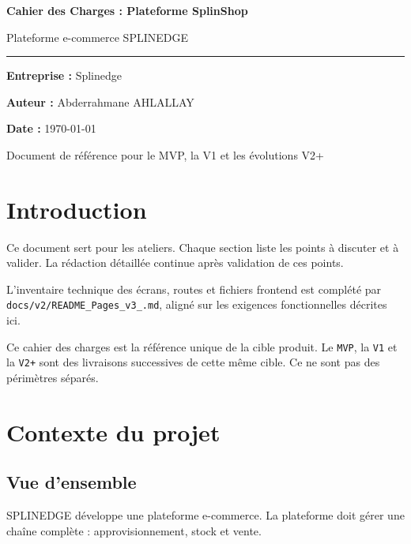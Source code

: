 \documentclass[11pt,a4paper]{scrreprt}
\newcommand{\code}[1]{\texttt{#1}}
\begin{document}
\begin{titlepage}
  \centering
  \vspace*{2cm}
  {\sffamily\bfseries\Huge\color{SplinGreen} Cahier des Charges : Plateforme SplinShop\par}
  \vspace{0.8cm}
  {\Large\color{SplinAmber} Plateforme e-commerce SPLINEDGE\par}
  \vspace{2cm}
  \rule{0.75\textwidth}{1.2pt}\par
  \vspace{1cm}
  {\Large \textbf{Entreprise :} Splinedge\par}
  \vspace{0.4cm}
  {\Large \textbf{Auteur :} Abderrahmane AHLALLAY\par}
  \vspace{0.4cm}
  {\Large \textbf{Date :} \today\par}
  \vfill
  {\large Document de référence pour le MVP, la V1 et les évolutions V2+\par}
\end{titlepage}

\tableofcontents
\clearpage

\chapter*{Introduction}
Ce document sert pour les ateliers. Chaque section liste les points à discuter et à valider. La rédaction détaillée continue après validation de ces points.

L'inventaire technique des écrans, routes et fichiers frontend est complété par \code{docs/v2/README\_Pages\_v3\_.md}, aligné sur les exigences fonctionnelles décrites ici.

Ce cahier des charges est la référence unique de la cible produit. Le \code{MVP}, la \code{V1} et la \code{V2+} sont des livraisons successives de cette même cible. Ce ne sont pas des périmètres séparés.

\chapter{Contexte du projet}

\section{Vue d'ensemble}
SPLINEDGE développe une plateforme e-commerce. La plateforme doit gérer une chaîne complète : approvisionnement, stock et vente.
\end{document}
